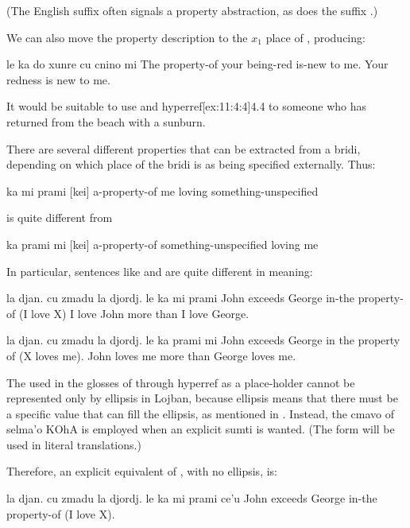 (The English suffix  often signals a property
    abstraction, as does the suffix .) 

We can also move the property description to the $x_1$ place of
    , producing:
\begin{example}
le ka do xunre  cu cnino mi\n
The property-of your being-red is-new to me.\n
Your redness is new to me.
\end{example}

It would be suitable to use 
    and hyperref[ex:11:4:4]{4.4} to someone who has returned from
    the beach with a sunburn. 

There are several different properties that can be extracted
    from a bridi, depending on which place of the bridi is
     as being specified externally. Thus:
\begin{example}
ka mi prami  [kei]\n
a-property-of me loving something-unspecified
\end{example}

{\noindent}is quite different from
\begin{example}
ka  prami mi [kei]\n
a-property-of something-unspecified loving me
\end{example}

In particular, sentences like  and  are quite different
    in meaning:
\begin{example}
la djan. cu zmadu la djordj. le ka mi prami\n
John exceeds George in-the property-of (I love X)\n
I love John more than I love George.
\end{example}

\begin{example}
la djan. cu zmadu la djordj. le ka prami mi\n
John exceeds George in the property of (X loves me).\n
John loves me more than George loves me.
\end{example}

The  used in the glosses of  through hyperref as a place-holder
    cannot be represented only by ellipsis in Lojban, because
    ellipsis means that there must be a specific value that can
    fill the ellipsis, as mentioned in .
    Instead, the cmavo  of selma'o KOhA is employed when an
    explicit sumti is wanted. (The form  will be used in
    literal translations.)

Therefore, an explicit equivalent of , with no ellipsis, is:
\begin{example}
la djan. cu zmadu la djordj. le ka mi prami ce'u\n
John exceeds George in-the property-of (I love X).
\end{example}

